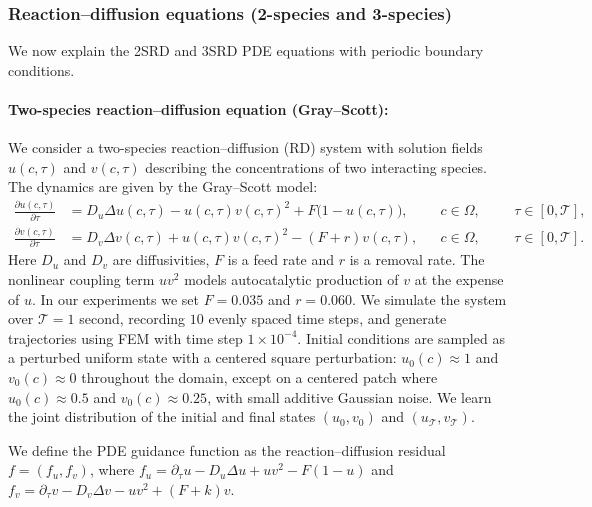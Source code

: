 \subsubsection{Reaction--diffusion equations (2-species and 3-species)} \label{app:rd_equation_explanation}

We now explain the 2SRD and 3SRD PDE equations with periodic boundary conditions. 

\paragraph{Two-species reaction--diffusion equation (Gray--Scott):}
We consider a two-species reaction--diffusion (RD) system with solution fields
$u(c,\tau)$ and $v(c,\tau)$ describing the concentrations of two interacting species.
The dynamics are given by the Gray--Scott model:
\begin{equation}
\begin{aligned}
\frac{\partial u(c,\tau)}{\partial \tau} &= D_u \Delta u(c,\tau) - u(c,\tau)v(c,\tau)^2 + F\big(1-u(c,\tau)\big),
&& c\in\Omega, &&&\tau\in[0,\mathcal{T}],\\
\frac{\partial v(c,\tau)}{\partial \tau} &= D_v \Delta v(c,\tau) + u(c,\tau)v(c,\tau)^2 - (F+r)v(c,\tau),
&& c\in\Omega, &&&\tau\in[0,\mathcal{T}].
\end{aligned}
\label{eq:rd_2species}
\end{equation}
Here $D_u$ and $D_v$ are diffusivities, $F$ is a feed rate and $r$ is a removal rate. The nonlinear coupling term $u v^2$ models autocatalytic production of $v$ at the expense of $u$. In our experiments we set $F=0.035$ and $r=0.060$. We simulate the system over $\mathcal{T}=1$ second, recording $10$ evenly spaced time steps, and generate trajectories using FEM with time step $1\times 10^{-4}$. Initial conditions are sampled as a perturbed uniform state with a centered square perturbation: $u_0(c)\approx 1$ and $v_0(c)\approx 0$ throughout the domain, except on a centered patch where
$u_0(c)\approx 0.5$ and $v_0(c)\approx 0.25$, with small additive Gaussian noise. We learn the joint distribution of the initial and final states $(u_0,v_0)$ and $(u_{\mathcal{T}},v_{\mathcal{T}})$.

We define the PDE guidance function as the reaction--diffusion residual $f=(f_u,f_v)$, where $f_u = \partial_\tau u - D_u\Delta u + uv^2 - F(1-u)$ and $f_v = \partial_\tau v - D_v\Delta v - uv^2 + (F+k)v$.

